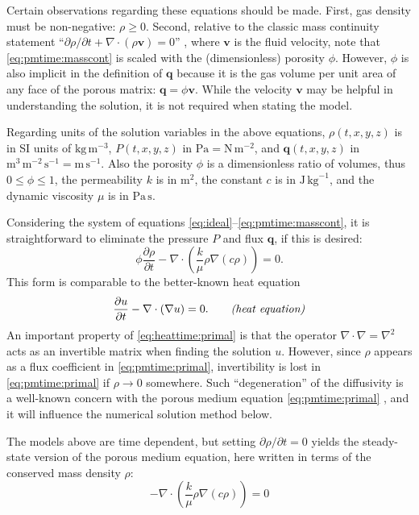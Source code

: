 \documentclass[11pt]{amsart}
\newcommand{\bq}{\mathbf{q}}
\newcommand{\bv}{\mathbf{v}}
\newcommand{\Div}{\nabla\cdot}
\newcommand{\grad}{\nabla}
\begin{document}
Certain observations regarding these equations should be made.  First, gas density must be non-negative: $\rho\ge 0$.  Second, relative to the classic mass continuity statement ``$\partial\rho/\partial t + \Div(\rho \bv)=0$'' \citep[for example]{Tadmor2012}, where $\bv$ is the fluid velocity, note that \eqref{eq:pmtime:masscont} is scaled with the (dimensionless) porosity $\phi$.  However, $\phi$ is also implicit in the definition of $\bq$ because it is the gas volume per unit area of any face of the porous matrix: $\bq = \phi \bv$.  While the velocity $\bv$ may be helpful in understanding the solution, it is not required when stating the model.

\newcommand{\Patm}{P_{\text{atm}}}

Regarding units of the solution variables in the above equations, $\rho(t,x,y,z)$ is in SI units of $\text{kg}\,\text{m}^{-3}$, $P(t,x,y,z)$ in $\text{Pa} = \text{N}\,\text{m}^{-2}$, and $\bq(t,x,y,z)$ in $\text{m}^3\,\text{m}^{-2}\,\text{s}^{-1} = \text{m}\,\text{s}^{-1}$.  Also the porosity $\phi$ is a dimensionless ratio of volumes, thus $0\le \phi \le 1$, the permeability $k$ is in $\text{m}^2$, the constant $c$ is in $\text{J}\,\text{kg}^{-1}$, and the dynamic viscosity $\mu$ is in $\text{Pa}\,\text{s}$.

Considering the system of equations \eqref{eq:ideal}--\eqref{eq:pmtime:masscont}, it is straightforward to eliminate the pressure $P$ and flux $\bq$, if this is desired:
\begin{equation}
\phi \frac{\partial \rho}{\partial t} - \Div \left(\frac{k}{\mu} \rho \grad\left(c \rho\right)\right) = 0. \label{eq:pmtime:primal}
\end{equation}
This form is comparable to the better-known heat equation
\begin{equation}
\frac{\partial u}{\partial t} - \Div(\grad u) = 0. \qquad \text{\emph{(heat equation)}}\label{eq:heattime:primal}
\end{equation}
An important property of \eqref{eq:heattime:primal} is that the operator $\Div \grad = \grad^2$ acts as an invertible matrix when finding the solution $u$.  However, since $\rho$ appears as a flux coefficient in \eqref{eq:pmtime:primal}, invertibility is lost in \eqref{eq:pmtime:primal} if $\rho\to 0$ somewhere.  Such ``degeneration'' of the diffusivity is a well-known concern with the porous medium equation \eqref{eq:pmtime:primal} \citep[for example]{Vazquez2007}, and it will influence the numerical solution method below.

The models above are time dependent, but setting $\partial \rho/\partial t = 0$ yields the steady-state version of the porous medium equation, here written in terms of the conserved mass density $\rho$:
\begin{equation}
- \Div\left(\frac{k}{\mu} \rho \grad\left(c \rho\right)\right) = 0
\label{eq:pm:strong}
\end{equation}
\end{document}
